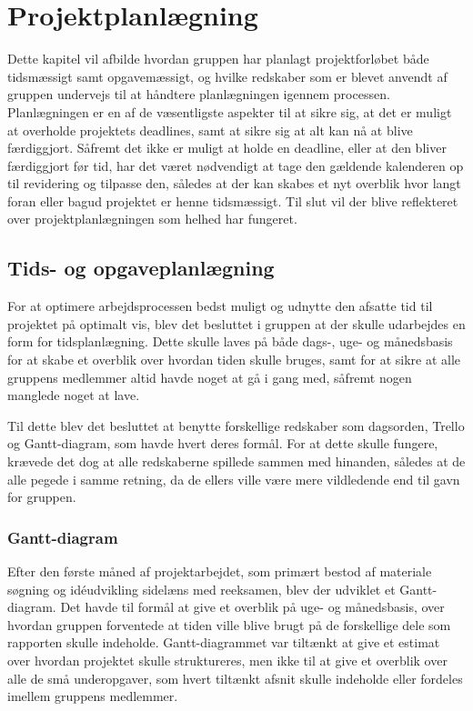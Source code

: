 \chapter{Projektplanlægning}\label{Projektplanlaegning}
Dette kapitel vil afbilde hvordan gruppen har planlagt projektforløbet både tidsmæssigt samt opgavemæssigt, og hvilke redskaber som er blevet anvendt af gruppen undervejs til at håndtere planlægningen igennem processen. Planlægningen er en af de væsentligste aspekter til at sikre sig, at det er muligt at overholde projektets deadlines, samt at sikre sig at alt kan nå at blive færdiggjort. Såfremt det ikke er muligt at holde en deadline, eller at den bliver færdiggjort før tid, har det været nødvendigt at tage den gældende kalenderen op til revidering og tilpasse den, således at der kan skabes et nyt overblik hvor langt foran eller bagud projektet er henne tidsmæssigt. Til slut vil der blive reflekteret over projektplanlægningen som helhed har fungeret.

\section{Tids- og opgaveplanlægning}\label{Tidsplanlaegning}
For at optimere arbejdsprocessen bedst muligt og udnytte den afsatte tid til projektet på optimalt vis, blev det besluttet i gruppen at der skulle udarbejdes en form for tidsplanlægning. Dette skulle laves på både dags-, uge- og månedsbasis for at skabe et overblik over hvordan tiden skulle bruges, samt for at sikre at alle gruppens medlemmer altid havde noget at gå i gang med, såfremt nogen manglede noget at lave.

\vspace{5mm}
 Til dette blev det besluttet at benytte forskellige redskaber som dagsorden, Trello og Gantt-diagram, som havde hvert deres formål. For at dette skulle fungere, krævede det dog at alle redskaberne spillede sammen med hinanden, således at de alle pegede i samme retning, da de ellers ville være mere vildledende end til gavn for gruppen.

\subsection*{Gantt-diagram}\label{Gantt-diagram}
Efter den første måned af projektarbejdet, som primært bestod af materiale søgning og idéudvikling sidelæns med reeksamen, blev der udviklet et Gantt-diagram. Det havde til formål at give et overblik på uge- og månedsbasis, over hvordan gruppen forventede at tiden ville blive brugt på de forskellige dele som rapporten skulle indeholde. Gantt-diagrammet var tiltænkt at give et estimat over hvordan projektet skulle struktureres, men ikke til at give et overblik over alle de små underopgaver, som hvert tiltænkt afsnit skulle indeholde eller fordeles imellem gruppens medlemmer.

